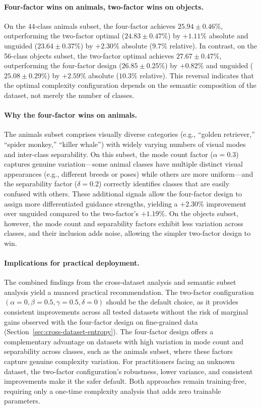 \paragraph{Four-factor wins on animals, two-factor wins on objects.}
On the 44-class animals subset, the four-factor \cags{} achieves $25.94 \pm 0.46\%$, outperforming the two-factor optimal ($24.83 \pm 0.47\%$) by $+1.11\%$ absolute and unguided ($23.64 \pm 0.37\%$) by $+2.30\%$ absolute ($9.7\%$ relative). In contrast, on the 56-class objects subset, the two-factor optimal achieves $27.67 \pm 0.47\%$, outperforming the four-factor design ($26.85 \pm 0.25\%$) by $+0.82\%$ and unguided ($25.08 \pm 0.29\%$) by $+2.59\%$ absolute ($10.3\%$ relative). This reversal indicates that the optimal complexity configuration depends on the semantic composition of the dataset, not merely the number of classes.

\paragraph{Why the four-factor wins on animals.}
The animals subset comprises visually diverse categories (e.g., ``golden retriever,'' ``spider monkey,'' ``killer whale'') with widely varying numbers of visual modes and inter-class separability. On this subset, the mode count factor ($\alpha{=}0.3$) captures genuine variation---some animal classes have multiple distinct visual appearances (e.g., different breeds or poses) while others are more uniform---and the separability factor ($\delta{=}0.2$) correctly identifies classes that are easily confused with others. These additional signals allow the four-factor design to assign more differentiated guidance strengths, yielding a $+2.30\%$ improvement over unguided compared to the two-factor's $+1.19\%$. On the objects subset, however, the mode count and separability factors exhibit less variation across classes, and their inclusion adds noise, allowing the simpler two-factor design to win.

\paragraph{Implications for practical deployment.}
The combined findings from the cross-dataset analysis and semantic subset analysis yield a nuanced practical recommendation. The two-factor configuration $(\alpha{=}0, \beta{=}0.5, \gamma{=}0.5, \delta{=}0)$ should be the default choice, as it provides consistent improvements across all tested datasets without the risk of marginal gains observed with the four-factor design on fine-grained data (Section~\ref{sec:cross-dataset-entropy}). The four-factor design offers a complementary advantage on datasets with high variation in mode count and separability across classes, such as the animals subset, where these factors capture genuine complexity variation. For practitioners facing an unknown dataset, the two-factor configuration's robustness, lower variance, and consistent improvements make it the safer default. Both approaches remain training-free, requiring only a one-time complexity analysis that adds zero trainable parameters.
